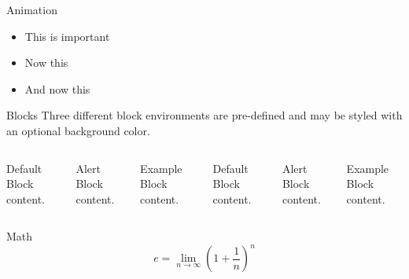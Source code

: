 \documentclass[9pt,serif,mathserif]{beamer}
\begin{document}
\begin{frame}{Animation}
    \begin{itemize}[<+- | alert@+>]
    \item \alert<4>{This is important}
    \item Now this
    \item And now this
    \end{itemize}
\end{frame}


\begin{frame}{Blocks}
    Three different block environments are pre-defined and may be styled with an
    optional background color.

    \begin{columns}[T,onlytextwidth]
        \begin{block}{Default}
        Block content.
        \end{block}

        \begin{alertblock}{Alert}
        Block content.
        \end{alertblock}

        \begin{exampleblock}{Example}
        Block content.
        \end{exampleblock}



        \begin{block}{Default}
        Block content.
        \end{block}

        \begin{alertblock}{Alert}
        Block content.
        \end{alertblock}

        \begin{exampleblock}{Example}
        Block content.
        \end{exampleblock}

    \end{columns}
\end{frame}

\begin{frame}{Math}
    \begin{equation*}
    e = \lim_{n\to \infty} \left(1 + \frac{1}{n}\right)^n
    \end{equation*}
\end{frame}
\end{document}
